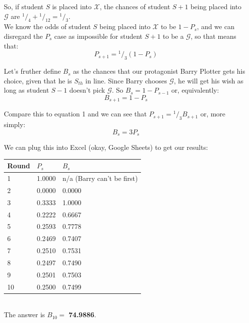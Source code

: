\documentclass[10pt, letterpaper]{article}
\newcommand*\rfrac[2]{{}^{#1}\!/_{#2}}
\begin{document}
So, if student $S$ is placed into $\mathcal{X}$, the chances of student $S+1$ being placed into $\mathcal{G}$ are
$\rfrac{1}{4} + \rfrac{1}{12} = \rfrac{1}{3}$.\\

We know the odds of student $S$ being placed into $\mathcal{X}$ to be $1-P_s$, and we can disregard the $P_s$ case as impossible for student $S+1$ to be a $\mathcal{G}$, so that means that:
\begin{equation}
    P_{s+1} = \rfrac{1}{3}(1 - P_s)
\end{equation}

Let's fruther define $B_s$ as the chances that our protagonist Barry Plotter gets his choice, given that he is $S_{th}$ in line.
Since Barry chooses $\mathcal{G}$, he will get his wish as long as student $S-1$ doesn't pick $\mathcal{G}$. So
$B_s = 1 - P_{s-1}$
or, equivalently:
\begin{equation}
    B_{s+1} = 1 - P_s
\end{equation}

Compare this to equation 1 and we can see that $P_{s+1} = \rfrac{1}{3}B_{s+1}$ or, more simply:
\begin{equation}
    B_s = 3P_s
\end{equation}

\pagebreak
We can plug this into Excel (okay, Google Sheets) to get our results:\\

\begin{tabular}{l | l | l }
    Round   & $P_s$     & $B_s$ \\ \hline
    1       & 1.0000    & n/a (Barry can't be first)\\
    2       & 0.0000    & 0.0000 \\
    3       & 0.3333    & 1.0000 \\
    4       & 0.2222    & 0.6667 \\
    5       & 0.2593    & 0.7778 \\
    6       & 0.2469    & 0.7407 \\
    7       & 0.2510    & 0.7531 \\
    8       & 0.2497    & 0.7490 \\
    9       & 0.2501    & 0.7503 \\
    10      & 0.2500    & 0.7499 \\
\end{tabular}\\

The answer is $B_{10} = $ \textbf{74.9886}.
\end{document}
